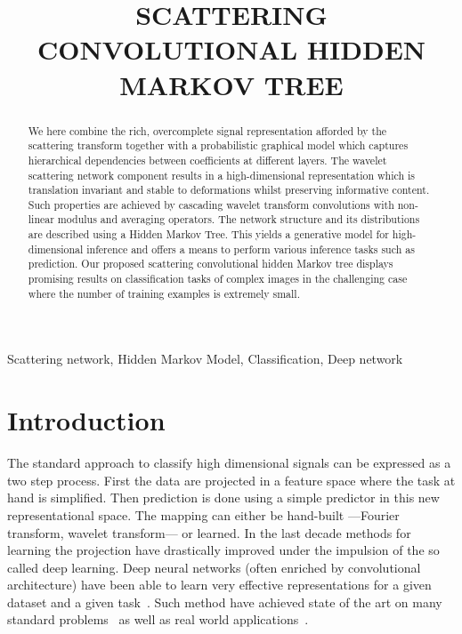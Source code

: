 \documentclass{article}
\title{SCATTERING CONVOLUTIONAL HIDDEN MARKOV TREE}
\begin{document}
%
\maketitle
%
\begin{abstract}
  We here combine the rich, overcomplete signal representation afforded by the scattering transform together with a probabilistic graphical model which captures hierarchical dependencies between coefficients at different layers. The wavelet scattering network component results in a high-dimensional representation which is translation invariant and stable to deformations whilst preserving informative content. Such properties are achieved by cascading wavelet transform convolutions with non-linear modulus and averaging operators. The network structure and its distributions are described using a Hidden Markov Tree. This yields a generative model for high-dimensional inference and offers a means to perform various inference tasks such as prediction. Our proposed scattering convolutional hidden Markov tree displays promising results on classification tasks of complex images in the challenging case where the number of training examples is extremely small. 
\end{abstract}
%
\begin{keywords}
  Scattering network, Hidden Markov Model, Classification, Deep network
\end{keywords}
%
\section{Introduction}
  \label{sec:Intro}
  \vspace{-5pt}
  The standard approach to classify high dimensional signals can be expressed as a two step process. First the data are projected in a feature space where the task at hand is simplified. Then prediction is done using a simple predictor in this new representational space. The mapping can either be hand-built ---\eg Fourier transform, wavelet transform--- or learned. In the last decade methods for learning the projection have drastically improved under the impulsion of the so called deep learning. Deep neural networks (often enriched by convolutional architecture) have been able to learn very effective representations for a given dataset and a given task~\cite{salakhutdinov2009deep, vincent2010stacked,
  lecun1995convolutional}. Such method have achieved state of the art on many standard problems~\cite{krizhevsky2012imagenet, hinton2012improving} as well as real world applications~\cite{huval2015empirical}. 
\end{document}
